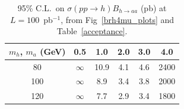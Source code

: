 \documentclass[aps,12pt,superscriptaddress,nofootinbib,floatfix,showpacs]{revtex4}
\begin{document}
\begin{table}[htb]
\caption{95\% C.L.\ on $\sigma(pp \to h) B_{h \to aa}$ (pb) at $L = 100$~pb$^{-1}$, from Fig~\ref{brh4mu_plots} and Table~\ref{acceptance}. \label{table_both_factorized}}
\begin{center}
\renewcommand{\arraystretch}{1.3}
\begin{tabular}{| c | c | c | c | c | c |}
\hline
\mbox{\hspace{0.25 cm}}$m_h$, $m_a$ (GeV)\mbox{\hspace{0.25 cm}} & \mbox{\hspace{0.25 cm}}0.5\mbox{\hspace{0.25 cm}} & \mbox{\hspace{0.25 cm}}1.0\mbox{\hspace{0.25 cm}} & \mbox{\hspace{0.25 cm}}2.0\mbox{\hspace{0.25 cm}} & \mbox{\hspace{0.25 cm}}3.0\mbox{\hspace{0.25 cm}} & \mbox{\hspace{0.25 cm}}4.0\mbox{\hspace{0.25 cm}} \\\hline
80 & $\infty$ & 10.9 & 4.1 & 4.6 & 2400 \\\hline
100 & $\infty$ & 8.9 & 3.4 & 3.8 & 2000 \\\hline
120 & $\infty$ & 7.7 & 2.9 & 3.4 & 1800 \\\hline
\end{tabular}
\end{center}
\end{table}
\end{document}
